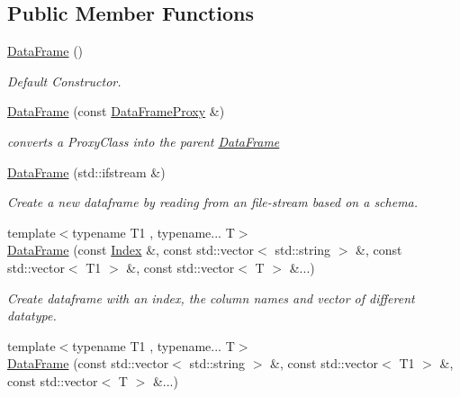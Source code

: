 \subsection*{Public Member Functions}
\begin{DoxyCompactItemize}
\item 
\mbox{\label{classDataFrame_a69a9dc47b7506b8062fd34aedacbf579}} 
\hyperlink{classDataFrame_a69a9dc47b7506b8062fd34aedacbf579}{Data\+Frame} ()
\begin{DoxyCompactList}\small\item\em Default Constructor. \end{DoxyCompactList}\item 
\hyperlink{classDataFrame_a1f727e3248f4a7cc83f1fbcc10246302}{Data\+Frame} (const \hyperlink{classDataFrame_1_1DataFrameProxy}{Data\+Frame\+Proxy} \&)
\begin{DoxyCompactList}\small\item\em converts a Proxy\+Class into the parent \hyperlink{classDataFrame}{Data\+Frame} \end{DoxyCompactList}\item 
\mbox{\label{classDataFrame_a31eb9b2eb2874c02156bcdad43ab2784}} 
\hyperlink{classDataFrame_a31eb9b2eb2874c02156bcdad43ab2784}{Data\+Frame} (std\+::ifstream \&)
\begin{DoxyCompactList}\small\item\em Create a new dataframe by reading from an file-\/stream based on a schema. \end{DoxyCompactList}\item 
\mbox{\label{classDataFrame_a6755d053118673ebf32e9f602ce18669}} 
{\footnotesize template$<$typename T1 , typename... T$>$ }\\\hyperlink{classDataFrame_a6755d053118673ebf32e9f602ce18669}{Data\+Frame} (const \hyperlink{classIndex}{Index} \&, const std\+::vector$<$ std\+::string $>$ \&, const std\+::vector$<$ T1 $>$ \&, const std\+::vector$<$ T $>$ \&...)
\begin{DoxyCompactList}\small\item\em Create dataframe with an index, the column names and vector of different datatype. \end{DoxyCompactList}\item 
{\footnotesize template$<$typename T1 , typename... T$>$ }\\\hyperlink{classDataFrame_a825048ac830a240d198c7096e86425fb}{Data\+Frame} (const std\+::vector$<$ std\+::string $>$ \&, const std\+::vector$<$ T1 $>$ \&, const std\+::vector$<$ T $>$ \&...)

\end{DoxyCompactItemize}
